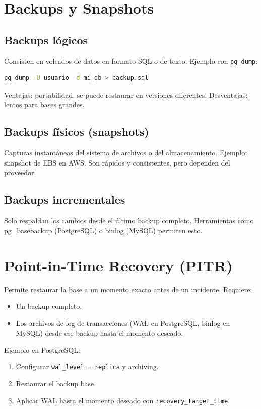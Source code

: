 \documentclass[12pt,a4paper,openany,oneside]{book}
\begin{document}
\section{Backups y Snapshots}
\subsection{Backups lógicos}
Consisten en volcados de datos en formato SQL o de texto. Ejemplo con \texttt{pg\_dump}:
\begin{lstlisting}[language=Bash]
pg_dump -U usuario -d mi_db > backup.sql
\end{lstlisting}
Ventajas: portabilidad, se puede restaurar en versiones diferentes. Desventajas: lentos para bases grandes.

\subsection{Backups físicos (snapshots)}
Capturas instantáneas del sistema de archivos o del almacenamiento. Ejemplo: snapshot de EBS en AWS. Son rápidos y consistentes, pero dependen del proveedor.

\subsection{Backups incrementales}
Solo respaldan los cambios desde el último backup completo. Herramientas como pg\_basebackup (PostgreSQL) o binlog (MySQL) permiten esto.

\section{Point-in-Time Recovery (PITR)}
Permite restaurar la base a un momento exacto antes de un incidente. Requiere:
\begin{itemize}
    \item Un backup completo.
    \item Los archivos de log de transacciones (WAL en PostgreSQL, binlog en MySQL) desde ese backup hasta el momento deseado.
\end{itemize}
Ejemplo en PostgreSQL:
\begin{enumerate}
    \item Configurar \texttt{wal\_level = replica} y archiving.
    \item Restaurar el backup base.
    \item Aplicar WAL hasta el momento deseado con \texttt{recovery\_target\_time}.
\end{enumerate}
\end{document}
